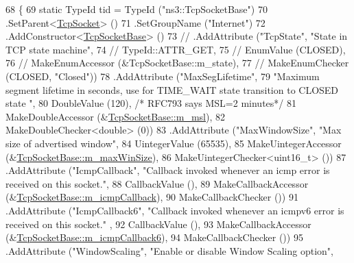 \begin{DoxyCode}
68 \{
69   \textcolor{keyword}{static} TypeId tid = TypeId (\textcolor{stringliteral}{"ns3::TcpSocketBase"})
70     .SetParent<\hyperlink{classns3_1_1TcpSocket_a70c351707b7af59abb6912cd7d145e60}{TcpSocket}> ()
71     .SetGroupName (\textcolor{stringliteral}{"Internet"})
72     .AddConstructor<\hyperlink{classns3_1_1TcpSocketBase_a89e51540a8ac03d929349ae2ec56239b}{TcpSocketBase}> ()
73 \textcolor{comment}{//    .AddAttribute ("TcpState", "State in TCP state machine",}
74 \textcolor{comment}{//                   TypeId::ATTR\_GET,}
75 \textcolor{comment}{//                   EnumValue (CLOSED),}
76 \textcolor{comment}{//                   MakeEnumAccessor (&TcpSocketBase::m\_state),}
77 \textcolor{comment}{//                   MakeEnumChecker (CLOSED, "Closed"))}
78     .AddAttribute (\textcolor{stringliteral}{"MaxSegLifetime"},
79                    \textcolor{stringliteral}{"Maximum segment lifetime in seconds, use for TIME\_WAIT state transition to CLOSED state
      "},
80                    DoubleValue (120), \textcolor{comment}{/* RFC793 says MSL=2 minutes*/}
81                    MakeDoubleAccessor (&\hyperlink{classns3_1_1TcpSocketBase_a668a2cc5cf751511263ee8a0766c9ea5}{TcpSocketBase::m\_msl}),
82                    MakeDoubleChecker<double> (0))
83     .AddAttribute (\textcolor{stringliteral}{"MaxWindowSize"}, \textcolor{stringliteral}{"Max size of advertised window"},
84                    UintegerValue (65535),
85                    MakeUintegerAccessor (&\hyperlink{classns3_1_1TcpSocketBase_a045897aa710b2ad3e99cefd66e8dc168}{TcpSocketBase::m\_maxWinSize}),
86                    MakeUintegerChecker<uint16\_t> ())
87     .AddAttribute (\textcolor{stringliteral}{"IcmpCallback"}, \textcolor{stringliteral}{"Callback invoked whenever an icmp error is received on this socket."},
88                    CallbackValue (),
89                    MakeCallbackAccessor (&\hyperlink{classns3_1_1TcpSocketBase_aef792b929bd15886a4b9a7132525a0ea}{TcpSocketBase::m\_icmpCallback}),
90                    MakeCallbackChecker ())
91     .AddAttribute (\textcolor{stringliteral}{"IcmpCallback6"}, \textcolor{stringliteral}{"Callback invoked whenever an icmpv6 error is received on this socket."}
      ,
92                    CallbackValue (),
93                    MakeCallbackAccessor (&\hyperlink{classns3_1_1TcpSocketBase_a75aca0603de58d7db7c0fa7daab34064}{TcpSocketBase::m\_icmpCallback6}),
94                    MakeCallbackChecker ())
95     .AddAttribute (\textcolor{stringliteral}{"WindowScaling"}, \textcolor{stringliteral}{"Enable or disable Window Scaling option"},

\end{DoxyCode}
